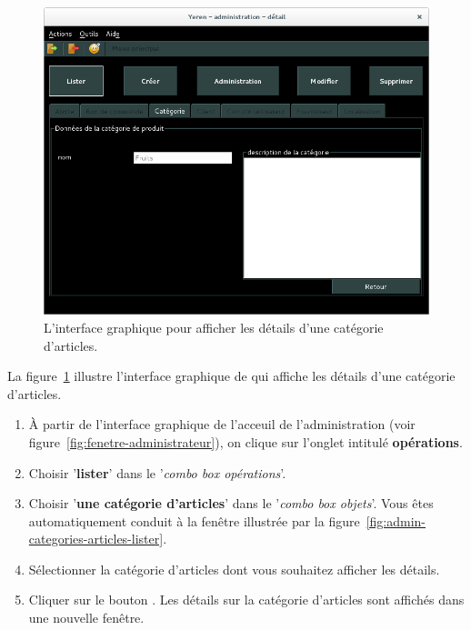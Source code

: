 

\begin{figure}[!htpb]
	\centering
	\includegraphics[scale=0.45]{images/categorie-articles-afficher-details.png}
	\caption{L'interface graphique pour afficher les d\'etails d'une
			cat\'egorie d'articles.}
	\label{fig:admin-categories-articles-afficher-details}
\end{figure}

La figure~\ref{fig:admin-categories-articles-afficher-details}
illustre l'interface graphique de \yeren qui affiche
les d\'etails d'une cat\'egorie d'articles.

\begin{enumerate}[1)]
	\item \`A partir de l'interface graphique de l'acceuil de
		l'administration (voir figure~\ref{fig:fenetre-administrateur}),
		on clique sur l'onglet intitul\'e \textbf{op\'erations}. 
		
	\item Choisir '\textbf{lister}' dans le '\emph{combo box
		op\'erations}'.
		
	\item Choisir '\textbf{une cat\'egorie d'articles}' dans le
		'\emph{combo box objets}'. Vous \^etes automatiquement
		conduit \`a la fen\^etre illustr\'ee par la
		figure~\ref{fig:admin-categories-articles-lister}.
		
	\item S\'electionner la cat\'egorie d'articles dont vous
		souhaitez afficher les d\'etails.
		
	\item Cliquer sur le bouton . Les d\'etails
		sur la cat\'egorie d'articles sont affich\'es dans une
		nouvelle fen\^etre.
\end{enumerate}


